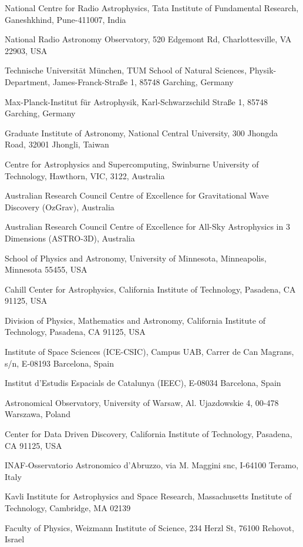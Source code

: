 \documentclass{nature_plusfigure}
\begin{document}
\begin{small}
\begin{affiliations}
\item National Centre for Radio Astrophysics, Tata Institute of Fundamental Research, Ganeshkhind, Pune-411007, India
\item National Radio Astronomy Observatory, 520 Edgemont Rd, Charlottesville, VA 22903, USA
\item Technische Universit{\"a}t M{\"u}nchen, TUM School of Natural Sciences, Physik-Department, James-Franck-Stra{\ss}e 1, 85748 Garching, Germany
\item Max-Planck-Institut f{\"u}r Astrophysik, Karl-Schwarzschild Stra{\ss}e 1, 85748 Garching, Germany
\item Graduate Institute of Astronomy, National Central University, 300 Jhongda Road, 32001 Jhongli, Taiwan
\item Centre for Astrophysics and Supercomputing, Swinburne University of Technology, Hawthorn, VIC, 3122, Australia
\item Australian Research Council Centre of Excellence for Gravitational Wave Discovery (OzGrav), Australia
\item Australian Research Council Centre of Excellence for All-Sky Astrophysics in 3 Dimensions (ASTRO-3D), Australia
\item School of Physics and Astronomy, University of Minnesota, Minneapolis, Minnesota 55455, USA
\item Cahill Center for Astrophysics, California Institute of Technology, Pasadena, CA 91125, USA
\item Division of Physics, Mathematics and Astronomy, California Institute of Technology, Pasadena, CA 91125, USA
\item Institute of Space Sciences (ICE-CSIC), Campus UAB, Carrer de Can Magrans, s/n, E-08193 Barcelona, Spain
\item Institut d'Estudis Espacials de Catalunya (IEEC), E-08034 Barcelona, Spain
\item Astronomical Observatory, University of Warsaw, Al. Ujazdowskie 4, 00-478 Warszawa, Poland
\item Center for Data Driven Discovery, California Institute of Technology, Pasadena, CA 91125, USA
\item INAF-Osservatorio Astronomico d’Abruzzo, via M. Maggini snc, I-64100 Teramo, Italy
\item Kavli Institute for Astrophysics and Space Research, Massachusetts Institute of Technology, Cambridge, MA 02139
\item Faculty of Physics, Weizmann Institute of Science, 234 Herzl St, 76100 Rehovot, Israel

\end{affiliations}
\end{small}
\end{document}
